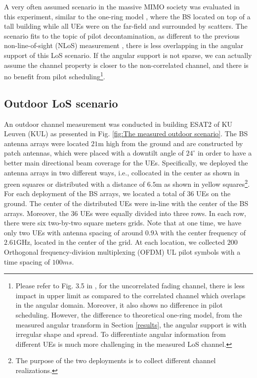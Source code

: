 A very often assumed scenario in the massive MIMO society was evaluated in this experiment, similar to the one-ring model \cite{bjornson2017massive}, where the BS located on top of a tall building while all UEs were on the far-field and surrounded by scatters. The scenario fits to the topic of pilot decontamination, as different to the previous  non-line-of-sight (NLoS) measurement \cite{Chen2018pilot}, there is less overlapping in the angular support of this LoS scenario. If the angular support is not sparse, we can actually assume the channel property is closer to the non-correlated channel, and there is no benefit from pilot scheduling\footnote{Please refer to Fig. 3.5 in \cite{bjornson2017massive}, for the uncorrelated fading channel,  there is less impact in upper limit as compared to the correlated channel which overlaps in the angular domain. Moreover, it also shows no difference in pilot scheduling. However, the difference to theoretical one-ring model, from the measured angular transform in Section \ref{results}, the angular support is with irregular shape and spread. To differentiate angular information from different UEs is much more challenging in the measured LoS channel.}.   
\subsection{Outdoor LoS scenario}
An outdoor channel measurement was conducted in building ESAT2 of KU Leuven (KUL) as presented in Fig. \ref{fig:The measured outdoor scenario}. The BS antenna arrays were located $21$m high from the ground and are constructed by patch antennas\cite{chen2017finite}, which were placed with a downtilt angle of $24^\circ$ in order to have a better main directional beam coverage for the UEs. Specifically, we deployed the antenna arrays in two different ways, i.e., collocated in the center as shown in green squares or distributed with a distance of $6.5$m as shown in yellow squares\footnote{The purpose of the two deployments is to collect different channel realizations.}. For each deployment of the BS arrays, we located a total of $36$ UEs on the ground. The center of the distributed UEs were in-line with the center of the BS arrays. Moreover, the $36$ UEs were equally divided into three rows. In each row, there were six two-by-two square meters grids. Note that at one time, we have only two UEs with antenna spacing of around $0.9\lambda$ with the center frequency of $2.61$GHz, located in the center of the grid. At each location, we collected $200$ Orthogonal frequency-division multiplexing (OFDM) UL pilot symbols with a time spacing of $100ms$.
